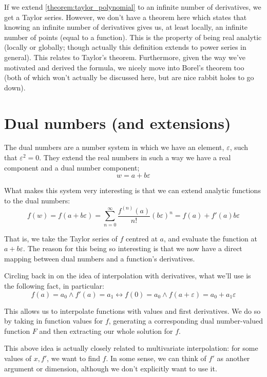 If we extend \ref{theorem:taylor_polynomial} to an infinite number of derivatives, we get a Taylor series. However, we don't have a theorem here which states that knowing an infinite number of derivatives gives us, at least locally, an infinite number of points (equal to a function). This is the property of being real analytic (locally or globally; though actually this definition extends to power series in general). This relates to Taylor's theorem. Furthermore, given the way we've motivated and derived the formula, we nicely move into Borel's theorem too (both of which won't actually be discussed here, but are nice rabbit holes to go down).


\section{Dual numbers (and extensions)}
\label{section:dual_numbers}
The dual numbers are a number system in which we have an element, $\varepsilon$, such that $\varepsilon^2=0$. They extend the real numbers in such a way we have a real component and a dual number component;
$$
w=a+b\varepsilon
$$

What makes this system very interesting is that we can extend analytic functions to the dual numbers:
$$
f(w)=f(a+b\varepsilon)=\sum_{n=0}^{\infty}{\frac{f^{(n)}(a)}{n!}(b\varepsilon)^n}=f(a)+f'(a)b\varepsilon
$$

That is, we take the Taylor series of $f$ centred at $a$, and evaluate the function at $a+b\varepsilon$. The reason for this being so interesting is that we now have a direct mapping between dual numbers and a function's derivatives.

Circling back in on the idea of interpolation with derivatives, what we'll use is the following fact, in particular:
$$
    f(a)=a_0\land f'(a)=a_1\leftrightarrow f(0)=a_0\land f(a+\varepsilon)=a_0+a_1\varepsilon
$$

This allows us to interpolate functions with values and first derivatives. We do so by taking in function values for $f$, generating a corresponding dual number-valued function $F$ and then extracting our whole solution for $f$.

This above idea is actually closely related to multivariate interpolation: for some values of $x, f'$, we want to find $f$. In some sense, we can think of $f'$ as another argument or dimension, although we don't explicitly want to use it.

